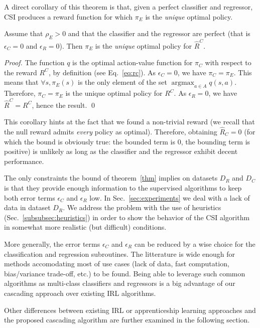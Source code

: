 \documentclass[smallextended]{svjour3}
\newcommand{\argmax}{\operatorname*{argmax}} %
\begin{document}
A direct corollary of this theorem is that, given a perfect classifier and regressor, CSI produces a reward function for which $\pi_E$ is the \emph{unique} optimal policy.
\begin{corollary}
  \label{cor}
  Assume that $\rho_E>0$ and that the classifier and the regressor are perfect (that is $\epsilon_C = 0$ and $\epsilon_R = 0$). Then $\pi_E$ is the \emph{unique} optimal policy for $\hat R^C$.
\end{corollary}
\begin{proof}

  The function $q$ is the optimal action-value function for $\pi_C$ with respect to the reward $R^C$, by definition (see Eq.~\eqref{eq:rc}).
  As $\epsilon_C = 0$, we have $\pi_C = \pi_E$. This means that $\forall s, \pi_E(s)$ is the only element of the set $\argmax_{a\in A}q(s,a)$. Therefore, $\pi_C = \pi_E$ is the unique optimal policy for $R^C$.
  As $\epsilon_R = 0$, we have $\hat R^C = R^C$, hence the result.
  \qed
\end{proof}
This corollary hints at the fact that we found a non-trivial reward (we recall that the null reward admits \emph{every} policy as optimal). Therefore, obtaining  $\hat{R}_C = 0$ (for which the bound is obviously true: the bounded term is $0$, the bounding term is positive) is unlikely as long as the classifier and the regressor exhibit decent performance.

The only constraints the bound of theorem~\ref{thm} implies on datasets $D_R$ and $D_C$ is that they provide enough information to the supervised algorithms to keep both error terms $\epsilon_C$ and $\epsilon_R$ low. In Sec.~\ref{sec:experiments} we deal with a lack of data in dataset $D_R$. We address the problem with the use of heuristics (Sec.~\ref{subsubsec:heuristics}) in order to show the behavior of the CSI algorithm in somewhat more realistic (but difficult) conditions.

More generally, the error terms  $\epsilon_C$ and $\epsilon_R$ can be reduced by a wise choice for the classification and regression subroutines. The litterature is wide enough for methods accomodating most of use cases (lack of data, fast computation, bias/variance trade-off, etc.) to be found. Being able to leverage such common algorithms as multi-class classifiers and regressors is a big advantage of our cascading approach over existing IRL algorithms.

Other differences between existing IRL or apprenticeship learning approaches and the proposed cascading algorithm are further examined in the following section.
\end{document}
